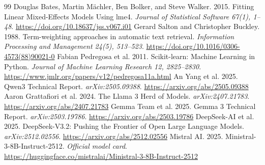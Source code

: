 \documentclass[sigconf,anonymous,review]{acmart}
\begin{document}
\begin{thebibliography}{99}
 Douglas Bates, Martin M\"achler, Ben Bolker, and Steve Walker. 2015. Fitting Linear Mixed-Effects Models Using lme4. \emph{Journal of Statistical Software 67(1), 1--48}. \url{https://doi.org/10.18637/jss.v067.i01}
 Gerard Salton and Christopher Buckley. 1988. Term-weighting approaches in automatic text retrieval. \emph{Information Processing and Management 24(5), 513--523}. \url{https://doi.org/10.1016/0306-4573(88)90021-0}
 Fabian Pedregosa et al. 2011. Scikit-learn: Machine Learning in Python. \emph{Journal of Machine Learning Research 12, 2825--2830}. \url{https://www.jmlr.org/papers/v12/pedregosa11a.html}
 An Yang et al. 2025. Qwen3 Technical Report. \emph{arXiv:2505.09388}. \url{https://arxiv.org/abs/2505.09388}
 Aaron Grattafiori et al. 2024. The Llama 3 Herd of Models. \emph{arXiv:2407.21783}. \url{https://arxiv.org/abs/2407.21783}
 Gemma Team et al. 2025. Gemma 3 Technical Report. \emph{arXiv:2503.19786}. \url{https://arxiv.org/abs/2503.19786}
 DeepSeek-AI et al. 2025. DeepSeek-V3.2: Pushing the Frontier of Open Large Language Models. \emph{arXiv:2512.02556}. \url{https://arxiv.org/abs/2512.02556}
 Mistral AI. 2025. Ministral-3-8B-Instruct-2512. \emph{Official model card}. \url{https://huggingface.co/mistralai/Ministral-3-8B-Instruct-2512}
\end{thebibliography}
\end{document}
